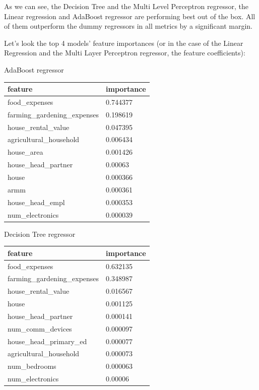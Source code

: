 \documentclass{article}
\begin{document}
As we can see, the Decision Tree and the Multi Level Perceptron regressor, the Linear regression and AdaBoost regressor are performing best out of the box. All of them outperform the dummy regressors in all metrics by a significant margin.

Let's look the top 4 models’ feature importances (or in the case of the Linear Regression and the Multi Layer Perceptron regressor, the feature coefficients):

\begin{multicols}{2}
AdaBoost regressor
\begin{flushleft}
\begin{tabular}{ |l|l| }
  \hline
  feature & importance\\
  \hline
  food\_expenses & 0.744377\\
  farming\_gardening\_expenses & 0.198619\\
  house\_rental\_value & 0.047395\\
  agricultural\_household & 0.006434\\
  house\_area & 0.001426\\
  house\_head\_partner & 0.00063\\
  house & 0.000366\\
  armm & 0.000361\\
  house\_head\_empl & 0.000353\\
  num\_electronics & 0.000039\\
  \hline
\end{tabular}
\end{flushleft}
Decision Tree regressor
\begin{flushleft}
\begin{tabular}{ |l|l| }
  \hline
  feature & importance\\
  \hline
  food\_expenses & 0.632135\\
  farming\_gardening\_expenses & 0.348987\\
  house\_rental\_value & 0.016567\\
  house & 0.001125\\
  house\_head\_partner & 0.000141\\
  num\_comm\_devices & 0.000097\\
  house\_head\_primary\_ed & 0.000077\\
  agricultural\_household & 0.000073\\
  num\_bedrooms & 0.000063\\
  num\_electronics & 0.00006\\
  \hline
\end{tabular}

\end{flushleft}
\end{multicols}
\end{document}

